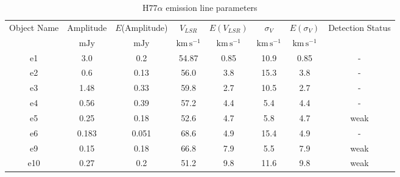 \begin{table*}[htp]
\caption{H$77\alpha$ emission line parameters}
\begin{tabular}{cccccccc}
\label{tab:h77a}
Object Name & Amplitude & $E$(Amplitude) & $V_{LSR}$ & $E(V_{LSR})$ & $\sigma_V$ & $E(\sigma_V)$ & Detection Status \\
 & $\mathrm{mJy}$ & $\mathrm{mJy}$ & $\mathrm{km\,s^{-1}}$ & $\mathrm{km\,s^{-1}}$ & $\mathrm{km\,s^{-1}}$ & $\mathrm{km\,s^{-1}}$ &  \\
\hline
e1 & 3.0 & 0.2 & 54.87 & 0.85 & 10.9 & 0.85 & - \\
e2 & 0.6 & 0.13 & 56.0 & 3.8 & 15.3 & 3.8 & - \\
e3 & 1.48 & 0.33 & 59.8 & 2.7 & 10.5 & 2.7 & - \\
e4 & 0.56 & 0.39 & 57.2 & 4.4 & 5.4 & 4.4 & - \\
e5 & 0.25 & 0.18 & 52.6 & 4.7 & 5.8 & 4.7 & weak \\
e6 & 0.183 & 0.051 & 68.6 & 4.9 & 15.4 & 4.9 & - \\
e9 & 0.15 & 0.18 & 66.8 & 7.9 & 5.5 & 7.9 & weak \\
e10 & 0.27 & 0.2 & 51.2 & 9.8 & 11.6 & 9.8 & weak \\
\hline
\end{tabular}

\end{table*}
